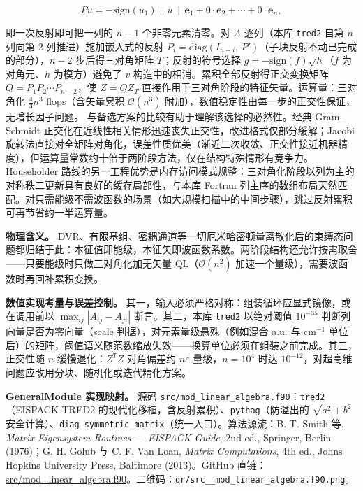 \documentclass[
]{ctexbook}
\begin{document}
\[Pu=-\mathrm{sign}(u_1)\|u\|\,\mathbf{e}_1+0\cdot\mathbf{e}_2+\cdots+0\cdot\mathbf{e}_n,\]

即一次反射即可把一列的 \(n-1\) 个非零元素清零。对 \(A\) 逐列（本库
\texttt{tred2} 自第 \(n\) 列向第 2 列推进）施加嵌入式的反射
\(P_i=\mathrm{diag}(I_{n-i},\,P')\)（子块反射不动已完成的部分），\(n-2\)
步后得三对角矩阵 \(T\)；反射的符号选择
\(g=-\mathrm{sign}(f)\sqrt{h}\)（\(f\) 为对角元、\(h\) 为模方）避免了
\(v\) 构造中的相消。累积全部反射得正交变换矩阵
\(Q=P_1P_2\cdots P_{n-2}\)，使 \(Z=QZ_T\)
直接作用于三对角阶段的特征矢量。运算量：三对角化 \(\frac{4}{3}n^{3}\)
flops（含矢量累积 \(\mathcal{O}(n^{3})\)
附加），数值稳定性由每一步的正交性保证，无增长因子问题。
与备选方案的比较有助于理解该选择的必然性。经典 Gram--Schmidt
正交化在近线性相关情形迅速丧失正交性，改进格式仅部分缓解；Jacobi
旋转法直接对全矩阵对角化，误差性质优美（渐近二次收敛、正交性接近机器精度），但运算量常数约十倍于两阶段方法，仅在结构特殊情形有竞争力。Householder
路线的另一工程优势是内存访问模式规整：三对角化阶段以列为主的对称秩二更新具有良好的缓存局部性，与本库
Fortran
列主序的数组布局天然匹配。对只需能级不需波函数的场景（如大规模扫描中的中间步骤），跳过反射累积可再节省约一半运算量。

\textbf{物理含义。}
DVR、有限基组、密耦通道等一切厄米哈密顿量离散化后的束缚态问题都归结于此：本征值即能级，本征矢即波函数系数。两阶段结构还允许按需取舍------只要能级时只做三对角化加无矢量
QL（\(\mathcal{O}(n^{2})\) 加速一个量级），需要波函数时再回补累积变换。

\textbf{数值实现考量与误差控制。}
其一，输入必须严格对称：组装循环应显式镜像，或在调用前以
\(\max_{ij}|A_{ij}-A_{ji}|\) 断言。其二，本库 \texttt{tred2} 以绝对阈值
\(10^{-35}\) 判断列向量是否为零向量（scale
判据），对元素量级悬殊（例如混合 a.u. 与 \(\mathrm{cm^{-1}}\)
单位后）的矩阵，阈值语义随范数缩放失效------换算单位必须在组装之前完成。其三，正交性随
\(n\) 缓慢退化：\(Z^{T}Z\) 对角偏差约 \(n\varepsilon\)
量级，\(n=10^{4}\) 时达
\(10^{-12}\)，对超高维问题应改用分块、随机化或迭代精化方案。

\textbf{GeneralModule 实现映射。} 源码
\texttt{src/mod\_linear\_algebra.f90}：\texttt{tred2}（EISPACK TRED2
的现代化移植，含反射累积）、\texttt{pythag}（防溢出的
\(\sqrt{a^{2}+b^{2}}\)
安全计算）、\texttt{diag\_symmetric\_matrix}（统一入口）。算法源流：B.
T. Smith 等, \emph{Matrix Eigensystem Routines --- EISPACK Guide}, 2nd
ed., Springer, Berlin (1976)；G. H. Golub 与 C. F. Van Loan,
\emph{Matrix Computations}, 4th ed., Johns Hopkins University Press,
Baltimore (2013)。GitHub
直链：\href{https://github.com/l1Ha/QuantumGeneralModule/blob/main/src/mod_linear_algebra.f90}{src/mod\_linear\_algebra.f90}。二维码：\texttt{qr/src\_\_mod\_linear\_algebra.f90.png}。
\end{document}
